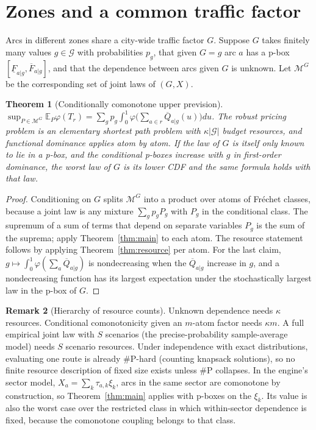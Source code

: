 \documentclass[11pt]{article}
\newtheorem{theorem}{Theorem}[section]
\theoremstyle{definition}
\newtheorem{remark}[theorem]{Remark}
\newcommand{\E}{\mathbb{E}}
\newcommand{\Qb}{\overline{Q}}
\newcommand{\Fl}{\underline{F}}
\newcommand{\Fu}{\overline{F}}
\newcommand{\cM}{\mathcal{M}}
\begin{document}
\section{Zones and a common traffic factor}\label{sec:factor}

Arcs in different zones share a city-wide traffic factor $G$. Suppose $G$ takes finitely many values $g\in\mathcal G$ with probabilities $p_g$, that given $G=g$ arc $a$ has a p-box $[\Fl_{a|g},\Fu_{a|g}]$, and that the dependence between arcs given $G$ is unknown. Let $\cM^G$ be the corresponding set of joint laws of $(G,X)$.

\begin{theorem}[Conditionally comonotone upper prevision]\label{thm:factor}
$\sup_{P\in\cM^G}\E_P\varphi(T_r)=\sum_gp_g\int_0^1\varphi\big(\sum_{a\in r}\Qb_{a|g}(u)\big)du$. The robust pricing problem is an elementary shortest path problem with $\kappa|\mathcal G|$ budget resources, and functional dominance applies atom by atom. If the law of $G$ is itself only known to lie in a p-box, and the conditional p-boxes increase with $g$ in first-order dominance, the worst law of $G$ is its lower CDF and the same formula holds with that law.
\end{theorem}
\begin{proof}
Conditioning on $G$ splits $\cM^G$ into a product over atoms of Fr\'echet classes, because a joint law is any mixture $\sum_gp_gP_g$ with $P_g$ in the conditional class. The supremum of a sum of terms that depend on separate variables $P_g$ is the sum of the suprema; apply Theorem~\ref{thm:main} to each atom. The resource statement follows by applying Theorem~\ref{thm:resource} per atom. For the last claim, $g\mapsto\int_0^1\varphi(\sum_a\Qb_{a|g})$ is nondecreasing when the $\Qb_{a|g}$ increase in $g$, and a nondecreasing function has its largest expectation under the stochastically largest law in the p-box of $G$.
\end{proof}

\begin{remark}[Hierarchy of resource counts]
Unknown dependence needs $\kappa$ resources. Conditional comonotonicity given an $m$-atom factor needs $\kappa m$. A full empirical joint law with $S$ scenarios (the precise-probability sample-average model) needs $S$ scenario resources. Under independence with exact distributions, evaluating one route is already \#P-hard (counting knapsack solutions), so no finite resource description of fixed size exists unless \#P collapses. In the engine's sector model, $X_a=\sum_k\tau_{a,k}\xi_k$, arcs in the same sector are comonotone by construction, so Theorem~\ref{thm:main} applies with p-boxes on the $\xi_k$. Its value is also the worst case over the restricted class in which within-sector dependence is fixed, because the comonotone coupling belongs to that class.
\end{remark}
\end{document}
